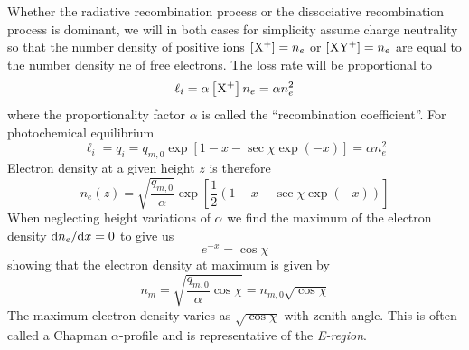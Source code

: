 Whether the radiative recombination process or the dissociative recombination process is dominant, we will in both cases for simplicity assume charge neutrality so that the number density of positive ions \([\prescript{}{}{\textnormal{X}}^+]=n_e\) or \([\prescript{}{}{\textnormal{XY}}^+]=n_e\) are equal to the number density ne of free electrons. The loss rate will be proportional to
\begin{equation*}
    \ell_i=\alpha \left[\prescript{}{}{\textnormal{X}}^+\right]n_e=\alpha n_e^2
\end{equation*}
where the proportionality factor \(\alpha \) is called the ``recombination coefficient''. For photochemical equilibrium
\begin{equation*}
    \ell_i=q_i=q_{m,0}\exp\left[1-x-\sec\chi\exp\left(-x\right)\right]=\alpha n_e^2
\end{equation*}
Electron density at a given height \(z\) is therefore
\begin{equation*}
    n_e(z)=\sqrt{\frac{q_{m,0}}{\alpha}}\exp\left[\frac{1}{2}\left(1-x-\sec\chi\exp\left(-x\right)\right)\right]
\end{equation*}
When neglecting height variations of \(\alpha \) we find the maximum of the electron density \(\textnormal{d}n_e/\textnormal{d}x=0\) to give us
\begin{equation*}
    e^{-x}=\cos\chi
\end{equation*}
showing that the electron density at maximum is given by
\begin{equation*}
    n_m=\sqrt{\frac{q_{m,0}}{\alpha}\cos\chi}=n_{m,0}\sqrt{\cos\chi}
\end{equation*}
The maximum electron density varies as \(\sqrt{\cos\chi}\) with zenith angle. This is often called a Chapman \(\alpha \)-profile and is representative of the \emph{E-region}.

